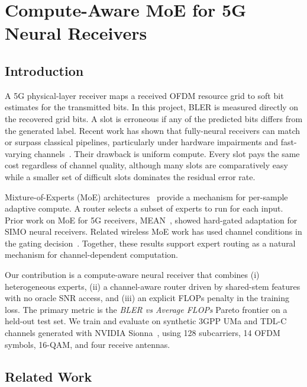
\chapter{Compute-Aware MoE for 5G Neural Receivers}
\label{chap:main}

\section{Introduction}
\label{sec:intro}

A 5G physical-layer receiver maps a received OFDM resource grid to soft bit estimates for the transmitted bits. In this project, BLER is measured directly on the recovered grid bits. A slot is erroneous if any of the predicted bits differs from the generated label. Recent work has shown that fully-neural receivers can match or surpass classical pipelines, particularly under hardware impairments and fast-varying channels~\cite{honkala2021deeprx,wiesmayr2024nrx}. Their drawback is uniform compute. Every slot pays the same cost regardless of channel quality, although many slots are comparatively easy while a smaller set of difficult slots dominates the residual error rate.

Mixture-of-Experts (MoE) architectures~\cite{shazeer2017outrageously,fedus2022switch} provide a mechanism for per-sample adaptive compute. A router selects a subset of experts to run for each input. Prior work on MoE for 5G receivers, MEAN~\cite{vanbolderik2024mean}, showed hard-gated adaptation for SIMO neural receivers. Related wireless MoE work has used channel conditions in the gating decision~\cite{song2025channelaware}. Together, these results support expert routing as a natural mechanism for channel-dependent computation.

Our contribution is a compute-aware neural receiver that combines (i) heterogeneous experts, (ii) a channel-aware router driven by shared-stem features with no oracle SNR access, and (iii) an explicit FLOPs penalty in the training loss. The primary metric is the \emph{BLER vs Average FLOPs} Pareto frontier on a held-out test set. We train and evaluate on synthetic 3GPP UMa and TDL-C channels generated with NVIDIA Sionna~\cite{sionna}, using \num{128} subcarriers, \num{14} OFDM symbols, 16-QAM, and four receive antennas.

\section{Related Work}
\label{sec:related}

